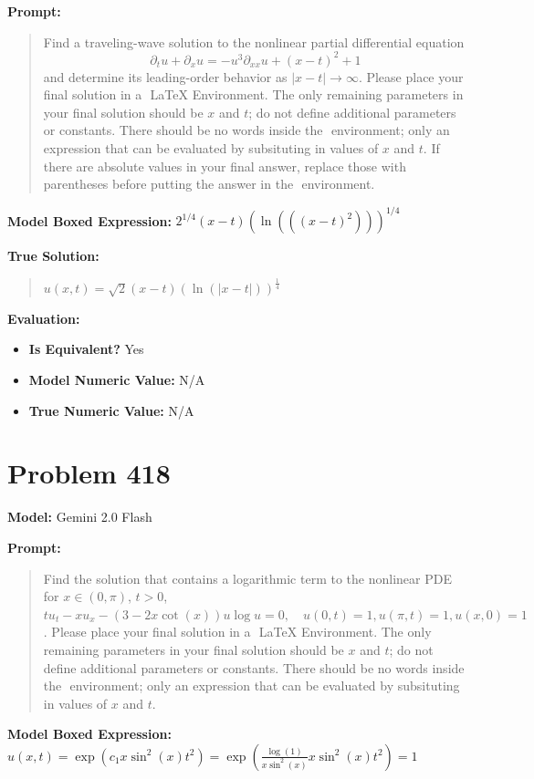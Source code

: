 \documentclass{article}
\begin{document}
\textbf{Prompt:}
\begin{quote}
Find a traveling-wave solution to the nonlinear partial differential equation $$\partial_t u + \partial_x u = -u^3 \partial_{xx}u + (x-t)^2 + 1$$ and determine its leading-order behavior as $|x-t| \to \infty$. Please place your final solution in a $\boxed{}$ LaTeX Environment. The only remaining parameters in your final solution should be $x$ and $t$; do not define additional parameters or constants. There should be no words inside the $\boxed{}$ environment; only an expression that can be evaluated by subsituting in values of $x$ and $t$. If there are absolute values in your final answer, replace those with parentheses before putting the answer in the $\boxed{}$ environment.
\end{quote}
\textbf{Model Boxed Expression:} $2^{1/4} (x-t) (\ln(((x-t)^2)))^{1/4}$

\textbf{True Solution:}
\begin{quote}
$u(x,t) = \sqrt{2} (x-t) (\ln(|x-t|))^{\frac{1}{4}}$
\end{quote}

\textbf{Evaluation:}
\begin{itemize}
\item \textbf{Is Equivalent?} Yes
\item \textbf{Model Numeric Value:} N/A
\item \textbf{True Numeric Value:} N/A
\end{itemize}
\vspace{1cm}
\section*{Problem 418}
\textbf{Model:} Gemini 2.0 Flash

\textbf{Prompt:}
\begin{quote}
Find the solution that contains a logarithmic term to the nonlinear PDE for $x \in (0, \pi)$, $t > 0$, $ t u_t - x u_x - (3 - 2x \cot(x) ) u \log u = 0, \quad u(0, t) = 1, u(\pi, t) = 1, u(x, 0) = 1 $. Please place your final solution in a $\boxed{}$ LaTeX Environment. The only remaining parameters in your final solution should be $x$ and $t$; do not define additional parameters or constants. There should be no words inside the $\boxed{}$ environment; only an expression that can be evaluated by subsituting in values of $x$ and $t$.
\end{quote}
\textbf{Model Boxed Expression:} $u(x,t) = \exp\left(c_1 x \sin^2(x) t^2\right) = \exp\left(\frac{\log(1)}{x \sin^2(x)} x \sin^2(x) t^2 \right) = 1$
\end{document}
